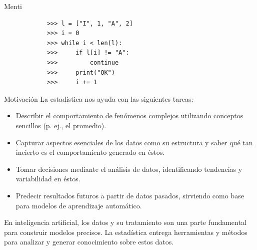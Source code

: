 \documentclass[aspectratio=169,handout]{beamer}
\begin{document}

    \begin{frame}[fragile]{Menti}
        \begin{verbatim}
            >>> l = ["I", 1, "A", 2]
            >>> i = 0
            >>> while i < len(l):
            >>>     if l[i] != "A":
            >>>         continue
            >>>     print("OK")
            >>>     i += 1
        \end{verbatim}
    \end{frame}

    \begin{frame}{Motivación}
        La estadística nos ayuda con las siguientes tareas:

        \begin{itemize}
            \item Describir el comportamiento de fenómenos complejos utilizando conceptos sencillos (p. ej., el promedio).
            \pause
            \item Capturar aspectos esenciales de los datos como su estructura y saber qué tan incierto es el comportamiento generado en éstos.
            \pause
            \item Tomar decisiones mediante el análisis de datos, identificando tendencias y variabilidad en éstos.
            \pause
            \item Predecir resultados futuros a partir de datos pasados, sirviendo como base para modelos de aprendizaje automático.
        \end{itemize}

        \pause
        En inteligencia artificial, los datos y su tratamiento son una parte fundamental para construir modelos precisos. La estadística entrega herramientas y métodos para analizar y generar conocimiento sobre estos datos. 
    \end{frame}
\end{document}
